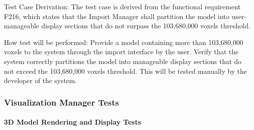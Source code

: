 \documentclass[12pt, titlepage]{article}
\begin{document}
\begin{enumerate}
Test Case Derivation: The test case is derived from the functional requirement F216, which states that the Import Manager shall partition the model into user-manageable display sections that do not surpass the 103,680,000 voxels threshold.
					
How test will be performed: Provide a model containing more than 103,680,000 voxels to the system through the import interface by the user. Verify that the system correctly partitions the model into manageable display sections that do not exceed the 103,680,000 voxels threshold. This will be tested manually by the developer of the system.

\end{enumerate}

\subsubsection{Visualization Manager Tests}

\paragraph{3D Model Rendering and Display Tests}
\end{document}
